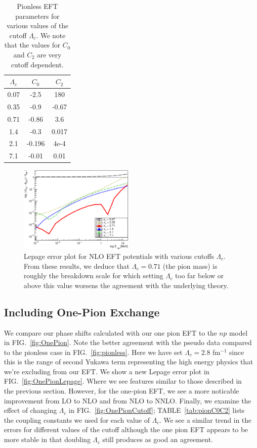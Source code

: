 \documentclass[10pt,showpacs,preprintnumbers,footinbib,amsmath,amssymb,aps,prl,twocolumn,groupedaddress,superscriptaddress,showkeys]{revtex4-1}
\begin{document}
\begin{table}
\centering
	\begin{tabular}{ c | c c }
	$\Lambda_c$ & $C_0$ & $C_2$\\
\hline
	0.07 & -2.5 & 180\\
	0.35 & -0.9 & -0.67\\
	0.71 & -0.86 & 3.6\\
	1.4 & -0.3 & 0.017\\
	2.1 & -0.196 & 4e-4\\
	7.1 & -0.01 & 0.01
	\end{tabular}
	\caption{Pionless EFT parameters for various values of the cutoff $\Lambda_c$.
	We note that the values for $C_0$ and $C_2$ are very cutoff dependent.}
	\label{tab:pionlessC0C2}
\end{table}

\begin{figure}
\centering
	\includegraphics[width=0.5\textwidth]{figures/phy989_pionlessCutoff.eps}
	\caption{Lepage error plot for NLO EFT potentials with various cutoffs $\Lambda_c$.
	From these results, we deduce that $\Lambda_c = 0.71$ (the pion mass) is roughly
	the breakdown scale for which setting $\Lambda_c$ too far below or above this
	value worsens the agreement with the underlying theory.}
	\label{fig:LepageCutoff}
\end{figure}
	





\subsection{Including One-Pion Exchange}

We compare our phase shifts calculated with our one pion EFT to the $np$ model
in FIG.~\ref{fig:OnePion}. Note the better agreement with the pseudo data compared
to the pionless case in FIG.~\ref{fig:pionless}. Here we have set $\Lambda_c = 2.8$
fm$^{-1}$ since this is the range of second Yukawa term representing the high energy
physics that we're excluding from our EFT. We show a new Lepage error plot in
FIG.~\ref{fig:OnePionLepage}. Where we see features similar to those described
in the previous section. However, for the one-pion EFT, we see a more noticable
improvement from LO to NLO and from NLO to NNLO. Finally, we examine the effect
of changing $\Lambda_c$ in FIG.~\ref{fig:OnePionCutoff}; TABLE~\ref{tab:pionC0C2}
lists the coupling constants we used for each value of $\Lambda_c$. We see a
similar trend in the errors for different values of the cutoff although the one pion
EFT appears to be more stable in that doubling $\Lambda_c$ still produces as good
an agreement.
\end{document}
